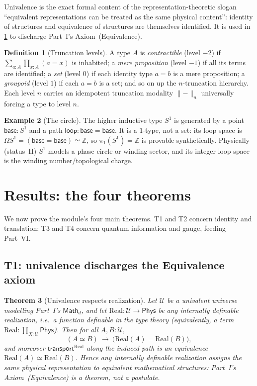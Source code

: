 \documentclass[12pt]{article}
\newtheorem{theorem}{Theorem}[section]
\theoremstyle{definition}
\newtheorem{definition}[theorem]{Definition}
\newtheorem{example}[theorem]{Example}
\theoremstyle{remark}
\newcommand{\Phys}{\mathsf{Phys}}
\newcommand{\Math}{\mathsf{Math}}
\newcommand{\Real}{\mathrm{Real}}
\newcommand{\Univ}{\mathcal{U}}
\newcommand{\transport}{\mathsf{transport}}
\begin{document}
Univalence is the exact formal content of the representation-theoretic slogan
``equivalent representations can be treated as the same physical content'':
identity of structures and equivalence of structures are themselves identified.
It is used in \cref{sec:results} to discharge Part~I's Axiom~(Equivalence).

\begin{definition}[Truncation levels]
\label{def:trunc}
A type $A$ is \emph{contractible} (level $-2$) if
$\sum_{a:A}\prod_{x:A}(a=x)$ is inhabited; a \emph{mere proposition}
(level $-1$) if all its terms are identified; a \emph{set}
(level $0$) if each identity type $a=b$ is a mere proposition; a
\emph{groupoid} (level $1$) if each $a=b$ is a set; and so on up the
$n$-truncation hierarchy. Each level $n$ carries an idempotent truncation
modality $\lVert-\rVert_n$ universally forcing a type to level $n$.
\end{definition}

\begin{example}[The circle]
\label{ex:circle}
The higher inductive type $S^1$ is generated by a point $\mathsf{base}:S^1$ and a
path $\mathsf{loop}:\mathsf{base}=\mathsf{base}$. It is a $1$-type, not a set:
its loop space is $\Omega S^1=(\mathsf{base}=\mathsf{base})\simeq\mathbb{Z}$, so
$\pi_1(S^1)=\mathbb{Z}$ is provable synthetically. Physically (status~$\mathrm{H}$)
$S^1$ models a phase circle or winding sector, and its integer loop space is the
winding number/topological charge.
\end{example}

\section{Results: the four theorems}
\label{sec:results}

We now prove the module's four main theorems. T1 and
T2 concern identity and translation; T3 and T4 concern quantum information and
gauge, feeding Part~VI.

\subsection{T1: univalence discharges the Equivalence axiom}

\begin{theorem}[Univalence respects realization]
\label{thm:univalence}
Let $\Univ$ be a univalent universe modelling Part~I's $\Math_d$, and let
$\Real:\Univ\to\Phys$ be any \emph{internally definable} realization, i.e.\ a
function definable in the type theory (equivalently, a term
$\Real:\prod_{X:\Univ}\Phys$). Then for all $A,B:\Univ$,
\[
(A\simeq B)\ \longrightarrow\ \bigl(\Real(A)=\Real(B)\bigr),
\]
and moreover $\transport^{\Real}$ along the induced path is an equivalence
$\Real(A)\simeq\Real(B)$. Hence any internally definable realization assigns the
same physical representation to equivalent mathematical structures: Part~I's
Axiom~(Equivalence) is a \emph{theorem}, not a postulate.
\end{theorem}
\end{document}
